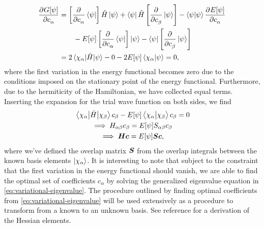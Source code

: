             \begin{align}
                \dpd[]{G[\psi]}{c_{\alpha}}
                &=
                \brak{
                    \dpd[]{}{c_{\alpha}}
                    \bra{\psi}
                }\hamil\ket{\psi}
                + \bra{\psi}\hamil
                \brak{
                    \dpd[]{}{c_{\beta}}
                    \ket{\psi}
                }
                -
                \braket{\psi}{\psi}
                \dpd[]{E[\psi]}{c_{\alpha}}
                \nonumber \\
                &\qquad
                -
                E[\psi]
                \brak{
                    \dpd[]{}{c_{\alpha}}
                    \bra{\psi}
                }\ket{\psi}
                -
                \bra{\psi}
                \brak{
                    \dpd[]{}{c_{\beta}}
                    \ket{\psi}
                }
                \\
                &=
                2 \mel{\chi_{\alpha}}{\hamil}{\psi}
                - 0
                - 2E[\psi]\braket{\chi_{\alpha}}{\psi}
                = 0,
            \end{align}
            where the first variation in the energy functional becomes zero due
            to the conditions imposed on the stationary point of the energy
            functional.
            Furthermore, due to the hermiticity of the Hamiltonian, we have
            collected equal terms.
            Inserting the expansion for the trial wave function on both sides,
            we find
            \begin{gather}
                \mel{\chi_{\alpha}}{\hat{H}}{\chi_{\beta}} c_{\beta}
                - E[\psi]\braket{\chi_{\alpha}}{\chi_{\beta}} c_{\beta}
                = 0
                \\
                \implies
                H_{\alpha\beta} c_{\beta}
                = E[\psi] S_{\alpha\beta} c_{\beta}
                \\
                \implies
                \boldsymbol{H} \boldsymbol{c}
                = E[\psi] \boldsymbol{S} \boldsymbol{c},
                \label{eq:variational-eigenvalue}
            \end{gather}
            where we've defined the overlap matrix $\boldsymbol{S}$ from the
            overlap integrals between the known basis elements
            $\ket{\chi_{\alpha}}$.
            It is interesting to note that subject to the constraint that the
            first variation in the energy functional should vanish, we are able
            to find the optimal set of coefficients $c_{\alpha}$ by solving the
            generalized eigenvalue equation in
            \autoref{eq:variational-eigenvalue}.
            The procedure outlined by finding optimal coefficients from
            \autoref{eq:variational-eigenvalue} will be used extensively as a
            procedure to transform from a known to an unknown basis.
            See reference \cite{helgaker-molecular} for a derivation of the
            Hessian elements.

